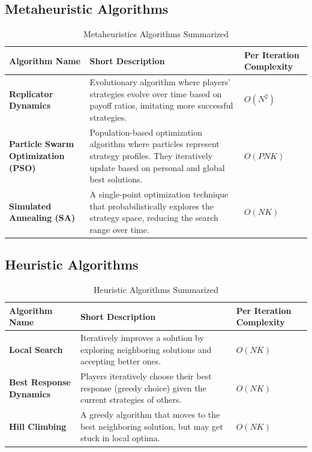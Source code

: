 \documentclass[12pt]{article}
\begin{document}
\subsection{Metaheuristic Algorithms}
    \begin{table}[ht]
    \centering
    \caption{Metaheuristics Algorithms Summarized}
    \begin{tabular}{|p{3cm}|p{8cm}|p{3cm}|}
    \hline
    \textbf{Algorithm Name} & \textbf{Short Description} & \textbf{Per Iteration Complexity} \\
    \hline
    \textbf{Replicator Dynamics} & Evolutionary algorithm where players' strategies evolve over time based on payoff ratios, imitating more successful strategies. & $O(N^2)$ \\
    \hline
    \textbf{Particle Swarm Optimization (PSO)} & Population-based optimization algorithm where particles represent strategy profiles. They iteratively update based on personal and global best solutions. & $O(PNK)$ \\
    \hline
    \textbf{Simulated Annealing (SA)} & A single-point optimization technique that probabilistically explores the strategy space, reducing the search range over time. & $O(NK)$ \\
    \hline
    \end{tabular}
    \end{table}


\subsection{Heuristic Algorithms}
\begin{table}[ht]
\centering
\caption{Heuristic Algorithms Summarized}
\begin{tabular}{|p{3cm}|p{8cm}|p{3cm}|}
\hline
\textbf{Algorithm Name} & \textbf{Short Description} & \textbf{Per Iteration Complexity} \\
\hline
\textbf{Local Search} & Iteratively improves a solution by exploring neighboring solutions and accepting better ones. & $O(NK)$ \\
\hline
\textbf{Best Response Dynamics} & Players iteratively choose their best response (greedy choice) given the current strategies of others. & $O(NK)$ \\
\hline
\textbf{Hill Climbing} & A greedy algorithm that moves to the best neighboring solution, but may get stuck in local optima. & $O(NK)$ \\
\hline
\end{tabular}
\end{table}
\end{document}
